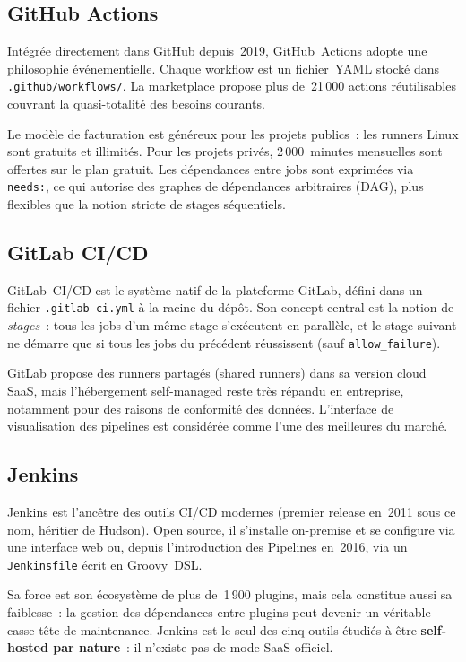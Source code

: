 \documentclass[12pt,a4paper]{report}
\begin{document}
\subsection{GitHub Actions}

Intégrée directement dans GitHub depuis~2019, GitHub~Actions adopte une
philosophie événementielle. Chaque workflow est un fichier~YAML stocké dans
\texttt{.github/workflows/}. La marketplace propose plus de~21\,000 actions
réutilisables couvrant la quasi-totalité des besoins courants.

Le modèle de facturation est généreux pour les projets publics~: les runners
Linux sont gratuits et illimités. Pour les projets privés, 2\,000~minutes
mensuelles sont offertes sur le plan gratuit. Les dépendances entre jobs sont
exprimées via \texttt{needs:}, ce qui autorise des graphes de dépendances
arbitraires (DAG), plus flexibles que la notion stricte de stages séquentiels.

\subsection{GitLab CI/CD}

GitLab~CI/CD est le système natif de la plateforme GitLab, défini dans un
fichier \texttt{.gitlab-ci.yml} à la racine du dépôt. Son concept central est la
notion de \emph{stages}~: tous les jobs d'un même stage s'exécutent en
parallèle, et le stage suivant ne démarre que si tous les jobs du précédent
réussissent (sauf \texttt{allow\_failure}).

GitLab propose des runners partagés (shared runners) dans sa version cloud
SaaS, mais l'hébergement self-managed reste très répandu en entreprise,
notamment pour des raisons de conformité des données. L'interface de
visualisation des pipelines est considérée comme l'une des meilleures du marché.

\subsection{Jenkins}

Jenkins est l'ancêtre des outils CI/CD modernes (premier release en~2011 sous
ce nom, héritier de Hudson). Open source, il s'installe on-premise et se
configure via une interface web ou, depuis l'introduction des Pipelines en~2016,
via un \texttt{Jenkinsfile} écrit en Groovy~DSL.

Sa force est son écosystème de plus de~1\,900 plugins, mais cela constitue
aussi sa faiblesse~: la gestion des dépendances entre plugins peut devenir un
véritable casse-tête de maintenance. Jenkins est le seul des cinq outils
étudiés à être \textbf{self-hosted par nature}~: il n'existe pas de mode SaaS
officiel.
\end{document}
